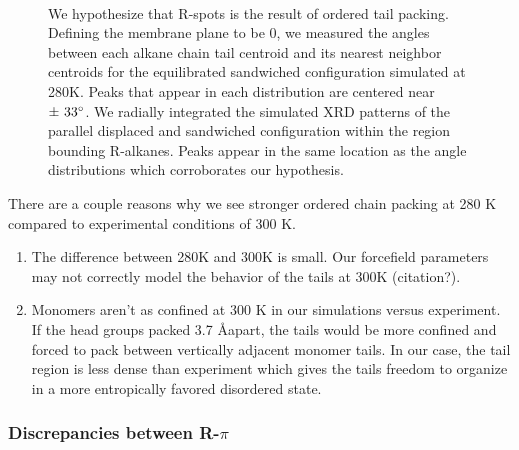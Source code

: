 \documentclass[journal=jpcbfk,manusciprt=article]{achemso}
\begin{document}
\begin{figure}[!htb]
\begin{subfigure}{\linewidth}
\begin{subfigure}{0.45\textwidth}
		\end{subfigure}
	\end{subfigure} 
    \caption{We hypothesize that R-spots is the result of ordered tail packing.
	  Defining the membrane plane to be 0\degree, we measured the angles between each
	  alkane chain tail centroid and its nearest neighbor centroids for the
	  equilibrated sandwiched configuration simulated at 280K. Peaks
	  that appear in each distribution are centered near $\pm~33\degree$. We radially
	  integrated the simulated XRD patterns of the parallel displaced and sandwiched
	  configuration within the region bounding R-alkanes.
	  Peaks appear in the same location as the angle distributions which corroborates
	  our hypothesis.}~\label{fig:tail_packing}
  \end{figure}  


  There are a couple reasons why we see stronger ordered chain packing at 280 K compared to
  experimental conditions of 300 K.
  \begin{enumerate}
  		\item The difference between 280K and 300K is small. Our forcefield parameters
  		may not correctly model the behavior of the tails at 300K (citation?).
  		\item Monomers aren't as confined at 300 K in our simulations versus experiment.
  		If the head groups packed 3.7 \AA apart, the tails would be more confined and forced
  		to pack between vertically adjacent monomer tails. In our case, the tail region is
  		less dense than experiment which gives the tails freedom to organize in a more
  		entropically favored disordered state. 
  \end{enumerate}
  
  \subsubsection{Discrepancies between R-$\pi$}\label{section:rpi}
  
\end{document}
